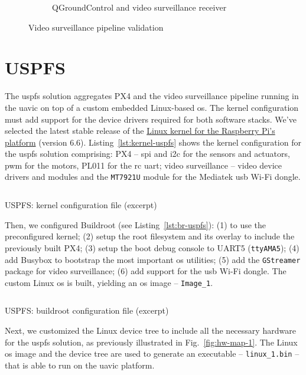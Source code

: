 \begin{figure}[htb!]
\begin{subfigure}[t]{.48\textwidth}
  \caption{QGroundControl and video surveillance receiver}%
  \label{fig:px4-qgc-cam-1}
  \end{subfigure}
  \caption{Video surveillance pipeline validation}%
  \label{fig:px4-qgc-cam}
\end{figure}

\section{USPFS}
\label{sec:uspfs-implem}
The \gls{uspfs} solution aggregates PX4 and the video surveillance pipeline
running in the \gls{uavic} on top of a custom embedded Linux-based
\gls{os}. The kernel configuration must add support for the device drivers
required for both software stacks. We've selected the latest stable release of
the \href{https://github.com/raspberrypi/linux}{Linux kernel for the Raspberry Pi's platform} (version
6.6). Listing~\ref{lst:kernel-uspfs} shows the kernel configuration for the
\gls{uspfs} solution comprising: PX4 -- \gls{spi} and \gls{i2c} for the sensors
and actuators, \gls{pwm} for the motors, PL011 for the \gls{rc} \gls{uart}; video
surveillance -- video device drivers and modules and the \lstinline{MT7921U}
module for the Mediatek \gls{usb} Wi-Fi dongle.

\begin{longlisting}
\centering
\inputminted[]{kconfig}{./listing/kernel-uspfs.config}
\caption{USPFS: kernel configuration file (excerpt)}
\label{lst:kernel-uspfs}
\end{longlisting}

Then, we configured Buildroot (see Listing~\ref{lst:br-uspfs}): (1) to use the
preconfigured kernel; (2) setup the root filesystem and its overlay to include
the previously built PX4; (3) setup the boot debug console to UART5
(\texttt{ttyAMA5}); (4) add Busybox to bootstrap the most important \gls{os}
utilities; (5) add the \texttt{GStreamer} package for video surveillance; (6)
add support for the \gls{usb} Wi-Fi dongle. The custom Linux \gls{os} is
built, yielding an \gls{os} image -- \texttt{Image\_1}.

\begin{longlisting}
\centering
\inputminted[]{kconfig}{./listing/br-uspfs.config}
\caption{USPFS: buildroot configuration file (excerpt)}
\label{lst:br-uspfs}
\end{longlisting}

Next, we customized the Linux device tree to include all the necessary hardware
for the \gls{uspfs} solution, as previously illustrated in
Fig.~\ref{fig:hw-map-1}. The Linux \gls{os} image and the device tree are used
to generate an executable -- \texttt{linux\_1.bin} -- that is able to run on the
\gls{uavic} platform.


